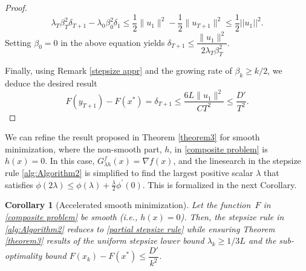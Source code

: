 \documentclass[11pt, a4paper, oneside, reqno]{amsart}
\newtheorem{corollary}[theorem]{Corollary}
\begin{document}
\begin{proof}
\begin{equation*}
\lambda_{T}\beta_{T}^2 \delta_{T+1} - \lambda_0\beta_{0}^2 \delta_{1} \leq \dfrac{1}{2}\|u_1\|^2 - \dfrac{1}{2}\|u_{T+1}\|^2 \leq \dfrac{1}{2}||u_1||^2.
\end{equation*}
Setting $\beta_0=0$ in the above equation yields $\delta_{T+1} \leq \dfrac{\|u_1\|^2}{2 \lambda_{T}\beta_{T}^2}$.

Finally, using Remark \ref{stepsize appr} and the growing rate of $\beta_k \geq k/2$, we deduce the desired result
\begin{equation*}
 F(y_{T+1}) - F(x^*) = \delta_{T+1} \leq \dfrac{6L\|u_1\|^2}{C T^2} \leq \dfrac{D'}{T^2}. %
\end{equation*}
\end{proof}
We can refine the result proposed in Theorem \ref{theorem3} for smooth minimization, where the non-smooth part, $h$, in \eqref{composite problem} is $h(x) = 0$. In this case, $G^{f}_{\lambda h}(x) = \nabla f(x)$, and the linesearch in the stepsize rule \ref{alg:Algorithm2} is simplified to find the largest positive scalar $\lambda$ that satisfies $\phi(2\lambda) \leq \phi(\lambda) + \frac{\lambda}{2}\phi^\prime(0)$. This is formalized in the next Corollary.
\begin{corollary}[Accelerated smooth minimization] \label{remark for smooth}
Let the function~$F$ in \eqref{composite problem} be smooth (i.e., $h(x) = 0$). Then, the stepsize rule in \ref{alg:Algorithm2} reduces to \eqref{partial stepsize rule} while ensuring Theorem \ref{theorem3} results of the uniform stepsize lower bound $\lambda_k \geq {1}/{3L}$ and the sub-optimality bound $F(x_k) - F(x^*) \leq \dfrac{D'}{k^2}$.
\end{corollary}
\end{document}
